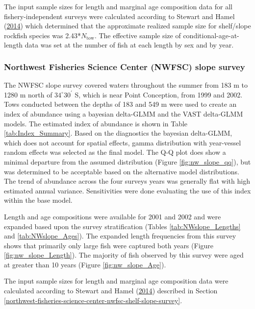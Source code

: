 \documentclass[12pt,]{article}
\begin{document}
The input sample sizes for length and marginal age composition data for
all fishery-independent surveys were calculated according to Stewart and
Hamel (\protect\hyperlink{ref-stewart_bootstrapping_2014}{2014}) which
determined that the approximate realized sample size for shelf/slope
rockfish species was 2.43*\(N_{\text{tow}}\). The effective sample size
of conditional-age-at-length data was set at the number of fish at each
length by sex and by year.

\subsubsection{Northwest Fisheries Science Center (NWFSC) slope
survey}\label{northwest-fisheries-science-center-nwfsc-slope-survey}

The NWFSC slope survey covered waters throughout the summer from 183 m
to 1280 m north of \(34^\circ 30^\prime\) S, which is near Point
Conception, from 1999 and 2002. Tows conducted between the depths of 183
and 549 m were used to create an index of abundance using a bayesian
delta-GLMM and the VAST delta-GLMM models. The estimated index of
abundance is shown in Table \ref{tab:Index_Summary}. Based on the
diagnostics the bayesian delta-GLMM, which does not account for spatial
effects, gamma distribution with year-vessel random effects was selected
as the final model. The Q-Q plot does show a minimal departure from the
assumed distribution (Figure \ref{fig:nw_slope_qq}), but was determined
to be acceptable based on the alternative model distributions. The trend
of abundance across the four surveys years was generally flat with high
estimated annual variance. Sensitivities were done evaluating the use of
this index within the base model.

Length and age compositions were available for 2001 and 2002 and were
expanded based upon the survey stratification (Tables
\ref{tab:NWslope_Lengths} and \ref{tab:NWslope_Ages}). The expanded
length frequencies from this survey shows that primarily only large fish
were captured both years (Figure \ref{fig:nw_slope_Length}). The
majority of fish observed by this survey were aged at greater than 10
years (Figure \ref{fig:nw_slope_Age}).

The input sample sizes for length and marginal age composition data were
calculated according to Stewart and Hamel
(\protect\hyperlink{ref-stewart_bootstrapping_2014}{2014}) described in
Section
\ref{northwest-fisheries-science-center-nwfsc-shelf-slope-survey}.
\end{document}
